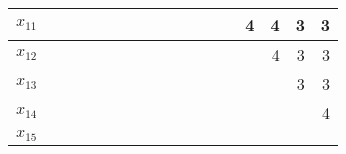 \begin{tabular}{| r | r | r | r | r | r | r | r | r | r | r | r | r | r | r | r | r |}
 $x_{11}$ & \diagbox{　}{　}& \diagbox{　}{　}& \diagbox{　}{　}& \diagbox{　}{　}& \diagbox{　}{　}& \diagbox{　}{　}& \diagbox{　}{　}& \diagbox{　}{　}& \diagbox{　}{　}& \diagbox{　}{　}& \diagbox{　}{　}& \diagbox{　}{　}& 4 & 4 & 3 & 3 \\ \hline 
 $x_{12}$ & \diagbox{　}{　}& \diagbox{　}{　}& \diagbox{　}{　}& \diagbox{　}{　}& \diagbox{　}{　}& \diagbox{　}{　}& \diagbox{　}{　}& \diagbox{　}{　}& \diagbox{　}{　}& \diagbox{　}{　}& \diagbox{　}{　}& \diagbox{　}{　}& \diagbox{　}{　}& 4 & 3 & 3 \\ \hline 
 $x_{13}$ & \diagbox{　}{　}& \diagbox{　}{　}& \diagbox{　}{　}& \diagbox{　}{　}& \diagbox{　}{　}& \diagbox{　}{　}& \diagbox{　}{　}& \diagbox{　}{　}& \diagbox{　}{　}& \diagbox{　}{　}& \diagbox{　}{　}& \diagbox{　}{　}& \diagbox{　}{　}& \diagbox{　}{　}& 3 & 3 \\ \hline 
 $x_{14}$ & \diagbox{　}{　}& \diagbox{　}{　}& \diagbox{　}{　}& \diagbox{　}{　}& \diagbox{　}{　}& \diagbox{　}{　}& \diagbox{　}{　}& \diagbox{　}{　}& \diagbox{　}{　}& \diagbox{　}{　}& \diagbox{　}{　}& \diagbox{　}{　}& \diagbox{　}{　}& \diagbox{　}{　}& \diagbox{　}{　}& 4 \\ \hline 
 $x_{15}$ & \diagbox{　}{　}& \diagbox{　}{　}& \diagbox{　}{　}& \diagbox{　}{　}& \diagbox{　}{　}& \diagbox{　}{　}& \diagbox{　}{　}& \diagbox{　}{　}& \diagbox{　}{　}& \diagbox{　}{　}& \diagbox{　}{　}& \diagbox{　}{　}& \diagbox{　}{　}& \diagbox{　}{　}& \diagbox{　}{　}& \diagbox{　}{　}\\ \hline 
\end{tabular}